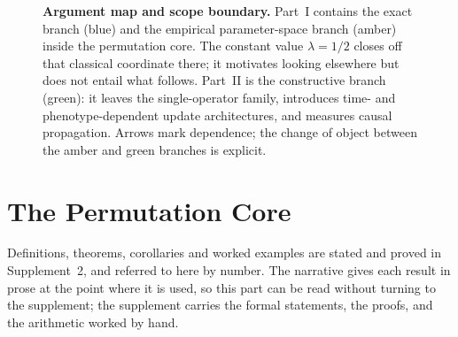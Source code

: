 \documentclass[man,12pt,floatsintext,donotrepeattitle]{apa7}
\begin{document}
\begin{figure}[H]
\caption{\textbf{Argument map and scope boundary.} Part~I contains the exact
branch (blue) and the empirical parameter-space branch (amber) inside the
permutation core. The constant value $\lambda=1/2$ closes off that classical
coordinate there; it motivates looking elsewhere but does not entail what
follows. Part~II is the constructive branch (green): it leaves the
single-operator family, introduces time- and phenotype-dependent update
architectures, and measures causal propagation. Arrows mark dependence; the
change of object between the amber and green branches is explicit.}
\label{fig:map}
\end{figure}

\part{The Permutation Core}

\noindent Definitions, theorems, corollaries and worked examples are stated and proved in
Supplement~2, and referred to here by number. The narrative gives each result in prose at
the point where it is used, so this part can be read without turning to the supplement;
the supplement carries the formal statements, the proofs, and the arithmetic worked by hand.
\end{document}
